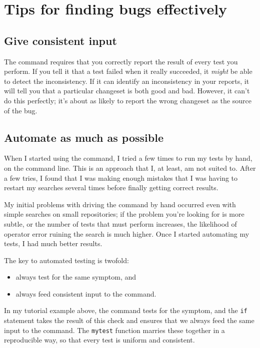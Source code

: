 \section{Tips for finding bugs effectively}

\subsection{Give consistent input}

The  command requires that you correctly report the
result of every test you perform.  If you tell it that a test failed
when it really succeeded, it \emph{might} be able to detect the
inconsistency.  If it can identify an inconsistency in your reports,
it will tell you that a particular changeset is both good and bad.
However, it can't do this perfectly; it's about as likely to report
the wrong changeset as the source of the bug.

\subsection{Automate as much as possible}

When I started using the  command, I tried a few times
to run my tests by hand, on the command line.  This is an approach
that I, at least, am not suited to.  After a few tries, I found that I
was making enough mistakes that I was having to restart my searches
several times before finally getting correct results.

My initial problems with driving the  command by hand
occurred even with simple searches on small repositories; if the
problem you're looking for is more subtle, or the number of tests that
 must perform increases, the likelihood of operator
error ruining the search is much higher.  Once I started automating my
tests, I had much better results.

The key to automated testing is twofold:
\begin{itemize}
\item always test for the same symptom, and
\item always feed consistent input to the  command.
\end{itemize}
In my tutorial example above, the  command tests for the
symptom, and the \texttt{if} statement takes the result of this check
and ensures that we always feed the same input to the 
command.  The \texttt{mytest} function marries these together in a
reproducible way, so that every test is uniform and consistent.

